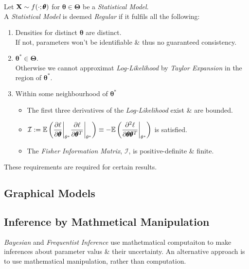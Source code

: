 \documentclass[11pt,a4paper]{article}
\begin{document}
Let $\textbf{X}\sim f(\cdot;\pmb\theta)$ for $\pmb\theta\in\pmb\Theta$ be a \textit{Statistical Model}.\\
A \textit{Statistical Model} is deemed \textit{Regular} if it fulfils all the following:
\begin{enumerate}
	\item Densities for distinct $\pmb\theta$ are distinct.\\
	\nb If not, parameters won't be identifiable \& thus no guaranteed consistency.
	\item $\pmb\theta^*\in\pmb\Theta$.\\
	\nb Otherwise we cannot approximat \textit{Log-Likelihood} by \textit{Taylor Expansion} in the region of $\pmb\theta^*$.
	\item Within some neighbourhood of $\pmb\theta^*$
	\begin{itemize}
		\item The first three derivatives of the \textit{Log-Likelihood} exist \& are bounded.
		\item $\mathcal{I}:=\mathbb{E}\left(\dfrac{\partial\ell}{\partial\pmb\theta}\bigg|_{\theta^*}\dfrac{\partial\ell}{\partial\pmb\theta^T}\bigg|_{\theta^*}\right)\equiv-\mathbb{E}\left(\dfrac{\partial^2\ell}{\partial\pmb\theta\pmb\theta^T}\bigg|_{\theta^*}\right)$ is satisfied.
		\item The \textit{Fisher Information Matrix}, $\mathcal{I}$, is positive-definite \& finite.
	\end{itemize}
\end{enumerate}
\nb These requirements are required for certain results.

\subsection{Graphical Models}


\subsection{Inference by Mathmetical Manipulation}


\textit{Bayesian} and \textit{Frequentist Inference} use mathetmatical computaiton to make inferences about parameter valus \& their uncertainty. An alternative approach is to use mathematical manipulation, rather than computation.\\
\end{document}
